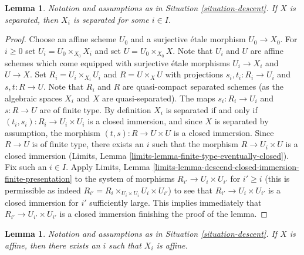 \documentclass{stacks-project}
\theoremstyle{plain}
\newtheorem{lemma}[subsection]{Lemma}
\theoremstyle{definition}
\theoremstyle{remark}
\numberwithin{equation}{subsection}
\begin{document}
\begin{lemma}
\label{lemma-descend-separated}
Notation and assumptions as in Situation \ref{situation-descent}.
If $X$ is separated, then $X_i$ is separated for some $i \in I$.
\end{lemma}

\begin{proof}
Choose an affine scheme $U_0$ and a surjective \'etale morphism $U_0 \to X_0$.
For $i \geq 0$ set $U_i = U_0 \times_{X_0} X_i$ and set
$U = U_0 \times_{X_0} X$. Note that $U_i$ and $U$ are affine schemes
which come equipped with surjective \'etale morphisms $U_i \to X_i$
and $U \to X$. Set $R_i = U_i \times_{X_i} U_i$ and $R = U \times_X U$
with projections $s_i, t_i : R_i \to U_i$ and $s, t : R \to U$.
Note that $R_i$ and $R$ are quasi-compact separated schemes (as the
algebraic spaces $X_i$ and $X$ are quasi-separated). The maps
$s_i : R_i \to U_i$ and $s : R \to U$ are of finite type.
By definition $X_i$ is separated if and only if
$(t_i, s_i) : R_i \to U_i \times U_i$
is a closed immersion, and since $X$ is separated by assumption,
the morphism $(t, s) : R \to U \times U$ is a closed immersion. Since
$R \to U$ is of finite type, there exists an
$i$ such that the morphism $R \to U_i \times U$ is a closed immersion
(Limits, Lemma \ref{limits-lemma-finite-type-eventually-closed}).
Fix such an $i \in I$. Apply Limits, Lemma
\ref{limits-lemma-descend-closed-immersion-finite-presentation}
to the system of morphisms $R_{i'} \to U_i \times U_{i'}$ for $i' \geq i$
(this is permissible as indeed
$R_{i'} = R_i \times_{U_i \times U_i} U_i \times U_{i'}$)
to see that $R_{i'} \to U_i \times U_{i'}$ is a closed immersion
for $i'$ sufficiently large. This implies immediately
that $R_{i'} \to U_{i'} \times U_{i'}$ is a closed immersion
finishing the proof of the lemma.
\end{proof}

\begin{lemma}
\label{lemma-limit-is-affine}
Notation and assumptions as in Situation \ref{situation-descent}.
If $X$ is affine, then there exists an $i$ such that $X_i$ is affine.
\end{lemma}
\end{document}
